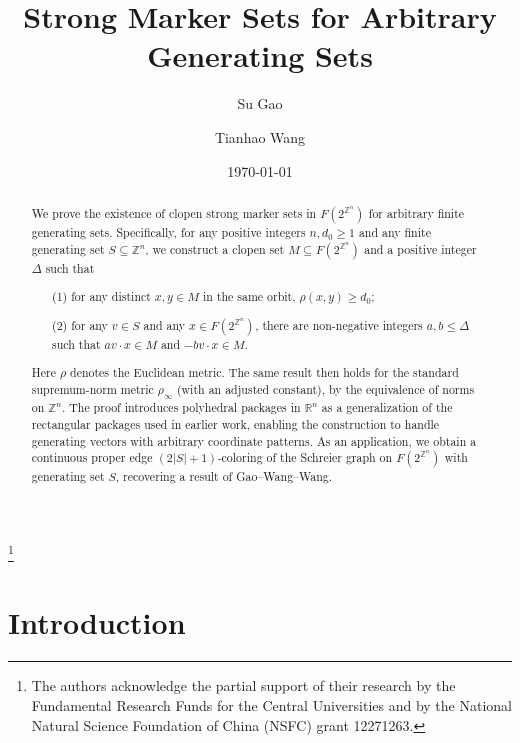 \documentclass{amsart}
\theoremstyle{definition}
\begin{document}
\title[Strong Marker Sets for Arbitrary Generating Sets]{Strong Marker Sets for Arbitrary Generating Sets}

\author{Su Gao}
\address{School of Mathematical Sciences and LPMC, Nankai University, Tianjin 300071, P.R. China}
\thanks{The authors acknowledge the partial support of their research by the Fundamental Research Funds for the Central Universities and by the National Natural Science Foundation of China (NSFC) grant 12271263.}

\author{Tianhao Wang}
\address{School of Mathematics and Computer Science, Quanzhou Normal University, Quanzhou 362000, P.R. China}

\date{\today}

\begin{abstract}
We prove the existence of clopen strong marker sets in $F(2^{\mathbb{Z}^n})$
for arbitrary finite generating sets. Specifically, for any positive integers
$n, d_0\geq 1$ and any finite generating set $S\subseteq \mathbb{Z}^n$, we construct
a clopen set $M\subseteq F(2^{\mathbb{Z}^n})$ and a positive integer $\Delta$ such that
\begin{enumerate}
\item[(1)] for any distinct $x,y\in M$ in the same orbit,
$\rho(x,y)\geq d_0$;
\item[(2)] for any $v\in S$ and any $x\in F(2^{\mathbb{Z}^n})$, there are
non-negative integers $a,b\leq \Delta$ such that
$av\cdot x\in M$ and $-bv\cdot x\in M$.
\end{enumerate}
Here $\rho$ denotes the Euclidean metric. The same result then holds for the
standard supremum-norm metric $\rho_\infty$ (with an adjusted constant), by the
equivalence of norms on $\mathbb{Z}^n$. The proof introduces polyhedral packages
in $\mathbb{R}^n$ as a generalization of the rectangular packages used in earlier
work, enabling the construction to handle generating vectors with arbitrary
coordinate patterns. As an application, we obtain a continuous proper edge
$(2|S|+1)$-coloring of the Schreier graph on $F(2^{\mathbb{Z}^n})$ with generating
set $S$, recovering a result of Gao--Wang--Wang.
\end{abstract}

\maketitle

\section{Introduction}
\end{document}
